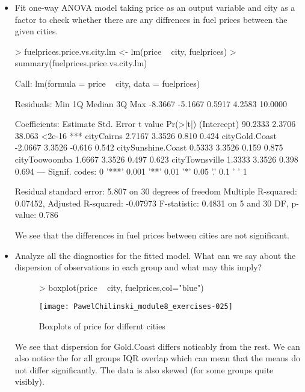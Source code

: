 \documentclass[a4paper]{article}
\begin{document}
\begin{itemize}
  \item  Fit one-way ANOVA model taking price  as an output variable and city 
  as a factor to check whether there are any diffrences in fuel prices between
  the given cities.
\begin{Schunk}
\begin{Sinput}
> fuelprices.price.vs.city.lm <- lm(price ~ city, fuelprices)	
> summary(fuelprices.price.vs.city.lm)
\end{Sinput}
\begin{Soutput}
Call:
lm(formula = price ~ city, data = fuelprices)

Residuals:
    Min      1Q  Median      3Q     Max 
-8.3667 -5.1667  0.5917  4.2583 10.0000 

Coefficients:
                   Estimate Std. Error t value Pr(>|t|)    
(Intercept)         90.2333     2.3706  38.063   <2e-16 ***
cityCairns           2.7167     3.3526   0.810    0.424    
cityGold.Coast      -2.0667     3.3526  -0.616    0.542    
citySunshine.Coast   0.5333     3.3526   0.159    0.875    
cityToowoomba        1.6667     3.3526   0.497    0.623    
cityTownsville       1.3333     3.3526   0.398    0.694    
---
Signif. codes:  0 '***' 0.001 '**' 0.01 '*' 0.05 '.' 0.1 ' ' 1

Residual standard error: 5.807 on 30 degrees of freedom
Multiple R-squared:  0.07452,	Adjusted R-squared:  -0.07973 
F-statistic: 0.4831 on 5 and 30 DF,  p-value: 0.786
\end{Soutput}
\end{Schunk}
We see that the differences in fuel prices between cities are not significant.

\item  Analyze all the diagnostics for the fitted model. What can we say about
the dispersion of observations in each group and what may this imply?

\begin{figure}[H]
\begin{center}
\begin{Schunk}
\begin{Sinput}
> boxplot(price ~ city, fuelprices,col="blue")
\end{Sinput}
\end{Schunk}
\texttt{[image: PawelChilinski\_module8\_exercises-025]}
\caption{Boxplots of price for differnt cities}
\label{BOXPLOT_PLON_AZOT}
\end{center}
\end{figure}
We see that dispersion for Gold.Coast differs noticably from the rest. We can
also notice the for all groups IQR overlap which can mean that the means do not
differ significantly. The data is also skewed (for some groups quite visibly).


\end{itemize}
\end{document}
